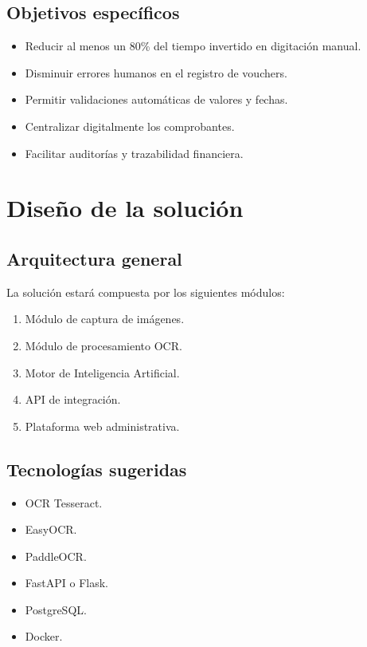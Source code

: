 \documentclass[12pt]{article}
\begin{document}
\subsection{Objetivos específicos}

\begin{itemize}
    \item Reducir al menos un 80\% del tiempo invertido en digitación manual.
    \item Disminuir errores humanos en el registro de vouchers.
    \item Permitir validaciones automáticas de valores y fechas.
    \item Centralizar digitalmente los comprobantes.
    \item Facilitar auditorías y trazabilidad financiera.
\end{itemize}

\section{Diseño de la solución}

\subsection{Arquitectura general}

La solución estará compuesta por los siguientes módulos:

\begin{enumerate}
    \item Módulo de captura de imágenes.
    \item Módulo de procesamiento OCR.
    \item Motor de Inteligencia Artificial.
    \item API de integración.
    \item Plataforma web administrativa.
\end{enumerate}

\subsection{Tecnologías sugeridas}

\begin{itemize}
    \item OCR Tesseract.
    \item EasyOCR.
    \item PaddleOCR.
    \item FastAPI o Flask.
    \item PostgreSQL.
    \item Docker.
\end{itemize}
\end{document}

